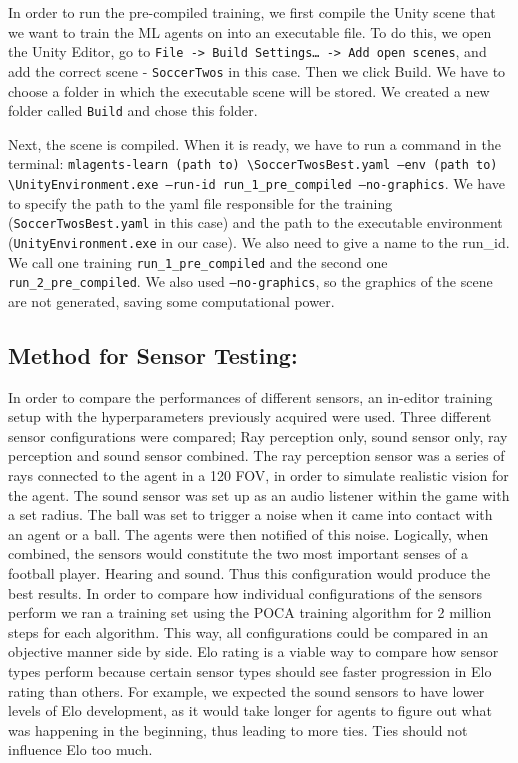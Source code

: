 \documentclass{LSkill}
\begin{document}
In order to run the pre-compiled training, we first compile the Unity scene that we want to train the ML agents on into an executable file. To do this, we open the Unity Editor, go to \texttt{File -> Build Settings… -> Add open scenes}, and add the correct scene - \texttt{SoccerTwos} in this case. Then we click Build. We have to choose a folder in which the executable scene will be stored. 
We created a new folder called \texttt{Build} and chose this folder. 

Next, the scene is compiled. When it is ready, we have to run a command in the terminal: \texttt{mlagents-learn (path to) \textbackslash SoccerTwosBest.yaml --env (path to) \textbackslash UnityEnvironment.exe --run-id run\_1\_pre\_compiled --no-graphics}. We have to specify the path to the yaml file responsible for the training (\texttt{SoccerTwosBest.yaml} in this case) and the path to the executable environment (\texttt{UnityEnvironment.exe} in our case). We also need to give a name to the run\_id. We call one training \texttt{run\_1\_pre\_compiled} and the second one 
\texttt{run\_2\_pre\_compiled}. We also used \texttt{--no-graphics}, so the graphics 
of the scene are not generated, saving some computational power.

\subsection{Method for Sensor Testing:}
In order to compare the performances of different sensors, an in-editor training setup with the hyperparameters previously acquired were used. Three different sensor configurations were compared; Ray perception only, sound sensor only, ray perception and sound sensor combined. The ray perception sensor was a series of rays connected to the agent in a 120 FOV, in order to simulate realistic vision for the agent. The sound sensor was set up as an audio listener within the game with a set radius. The ball was set to trigger a noise when it came into contact with an agent or a ball. The agents were then notified of this noise. Logically, when combined, the sensors would constitute the two most important senses of a football player. Hearing and sound. Thus this configuration would produce the best results. In order to compare how individual configurations of the sensors perform we ran a training set using the POCA training algorithm for 2 million steps for each algorithm. This way, all configurations could be compared in an objective manner side by side. 
Elo rating is a viable way to compare how sensor types perform because certain sensor types should see faster progression in Elo rating than others. For example, we expected the sound sensors to have lower levels of Elo development, as it would take longer for agents to figure out what was happening in the beginning, thus leading to more ties. Ties should not influence Elo too much. 
\end{document}
